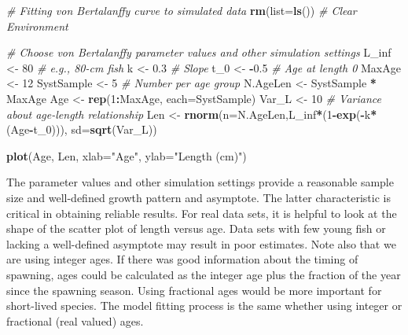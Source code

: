 \documentclass[
]{krantz}
\makeatletter
\newenvironment{Shaded}{\begin{snugshade}}{\end{snugshade}}
\newcommand{\AttributeTok}[1]{\textcolor[rgb]{0.27,0.27,0.27}{#1}}
\newcommand{\CommentTok}[1]{\textcolor[rgb]{0.37,0.37,0.37}{\textit{#1}}}
\newcommand{\DecValTok}[1]{\textcolor[rgb]{0.06,0.06,0.06}{#1}}
\newcommand{\FloatTok}[1]{\textcolor[rgb]{0.06,0.06,0.06}{#1}}
\newcommand{\FunctionTok}[1]{\textcolor[rgb]{0.27,0.27,0.27}{\textbf{#1}}}
\newcommand{\NormalTok}[1]{#1}
\newcommand{\OtherTok}[1]{\textcolor[rgb]{0.37,0.37,0.37}{#1}}
\newcommand{\SpecialCharTok}[1]{\textcolor[rgb]{0.43,0.43,0.43}{\textbf{#1}}}
\newcommand{\StringTok}[1]{\textcolor[rgb]{0.5,0.5,0.5}{#1}}
\newenvironment{kframe}{%
\medskip{}
\setlength{\fboxsep}{.8em}
 \def\at@end@of@kframe{}%
 \ifinner\ifhmode%
  \def\at@end@of@kframe{\end{minipage}}%
  \begin{minipage}{\columnwidth}%
 \fi\fi%
 \def\FrameCommand##1{\hskip\@totalleftmargin \hskip-\fboxsep
 \colorbox{shadecolor}{##1}\hskip-\fboxsep
     \hskip-\linewidth \hskip-\@totalleftmargin \hskip\columnwidth}%
 \MakeFramed {\advance\hsize-\width
   \@totalleftmargin\z@ \linewidth\hsize
   \@setminipage}}%
 {\par\unskip\endMakeFramed%
 \at@end@of@kframe}
\renewenvironment{Shaded}{\begin{kframe}}{\end{kframe}}
\makeatother
\begin{document}
\begin{Shaded}
\begin{Highlighting}[]
\CommentTok{\# Fitting von Bertalanffy curve to simulated data}
\FunctionTok{rm}\NormalTok{(}\AttributeTok{list=}\FunctionTok{ls}\NormalTok{()) }\CommentTok{\# Clear Environment}

\CommentTok{\# Choose von Bertalanffy parameter values and other simulation settings}
\NormalTok{L\_inf }\OtherTok{\textless{}{-}} \DecValTok{80}  \CommentTok{\# e.g., 80{-}cm fish}
\NormalTok{k }\OtherTok{\textless{}{-}} \FloatTok{0.3} \CommentTok{\# Slope}
\NormalTok{t\_0 }\OtherTok{\textless{}{-}} \SpecialCharTok{{-}}\FloatTok{0.5} \CommentTok{\# Age at length 0}
\NormalTok{MaxAge }\OtherTok{\textless{}{-}} \DecValTok{12}
\NormalTok{SystSample }\OtherTok{\textless{}{-}} \DecValTok{5}  \CommentTok{\# Number per age group}
\NormalTok{N.AgeLen }\OtherTok{\textless{}{-}}\NormalTok{ SystSample }\SpecialCharTok{*}\NormalTok{ MaxAge}
\NormalTok{Age }\OtherTok{\textless{}{-}} \FunctionTok{rep}\NormalTok{(}\DecValTok{1}\SpecialCharTok{:}\NormalTok{MaxAge, }\AttributeTok{each=}\NormalTok{SystSample)}
\NormalTok{Var\_L }\OtherTok{\textless{}{-}} \DecValTok{10} \CommentTok{\# Variance about age{-}length relationship}
\NormalTok{Len }\OtherTok{\textless{}{-}} \FunctionTok{rnorm}\NormalTok{(}\AttributeTok{n=}\NormalTok{N.AgeLen,L\_inf}\SpecialCharTok{*}\NormalTok{(}\DecValTok{1}\SpecialCharTok{{-}}\FunctionTok{exp}\NormalTok{(}\SpecialCharTok{{-}}\NormalTok{k}\SpecialCharTok{*}\NormalTok{(Age}\SpecialCharTok{{-}}\NormalTok{t\_0))), }\AttributeTok{sd=}\FunctionTok{sqrt}\NormalTok{(Var\_L))}

\FunctionTok{plot}\NormalTok{(Age, Len, }\AttributeTok{xlab=}\StringTok{"Age"}\NormalTok{, }\AttributeTok{ylab=}\StringTok{"Length (cm)"}\NormalTok{)}
\end{Highlighting}
\end{Shaded}

The parameter values and other simulation settings provide a reasonable sample size and well-defined growth pattern and asymptote. The latter characteristic is critical in obtaining reliable results. For real data sets, it is helpful to look at the shape of the scatter plot of length versus age. Data sets with few young fish or lacking a well-defined asymptote may result in poor estimates. Note also that we are using integer ages. If there was good information about the timing of spawning, ages could be calculated as the integer age plus the fraction of the year since the spawning season. Using fractional ages would be more important for short-lived species. The model fitting process is the same whether using integer or fractional (real valued) ages.
\end{document}
